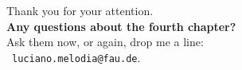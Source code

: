 \documentclass[aspectratio=169,t]{beamer}
\begin{document}
  { %
    \begin{frame}[c]
      \begin{center}
        Thank you for your attention.\\
        {\bf Any questions about the fourth chapter?}\\[0.5cm]
        Ask them now, or again, drop me a line: \\ 
        \faSendO \ \texttt{luciano.melodia@fau.de}.
      \end{center}
    \end{frame}
  }
\end{document}
